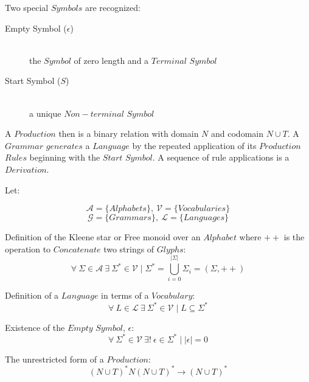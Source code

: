 \documentclass{article}
\begin{document}
Two special $Symbols$ are recognized:

    \begin{description}

    \item[Empty Symbol ($\epsilon$)] \hfill \\
    the $Symbol$ of zero length and a $Terminal$ $Symbol$

    \item[Start Symbol ($S$)] \hfill \\
    a unique $Non-terminal$ $Symbol$

    \end{description}

A $Production$ then is a binary relation with domain $N$ and codomain
$N \cup T$. A $Grammar$ $generates$ a $Language$ by the repeated application
of its $Production$ $Rules$ beginning with the $Start$ $Symbol$. A
sequence of rule applications is a $Derivation$.

Let:

\[
    \mathcal{A} = \{ Alphabets \},\: \mathcal{V} = \{ Vocabularies \}
\] \[
    \mathcal{G} = \{ Grammars \},\: \mathcal{L} = \{ Languages \}
\]

    \begin{description}

    \item Definition of the Kleene star or Free monoid over an
      $Alphabet$ where $++$ is the operation to $Concatenate$ two
      strings of $Glyphs$:
    \[
        \forall \: \Sigma \in \mathcal{A} \:
        \exists \: \Sigma^* \in \mathcal{V}
        \mid \Sigma^* = \bigcup_{i=0}^{|\Sigma|} \Sigma_i
        = (\Sigma,++)
    \]

    \item Definition of a $Language$ in terms of a $Vocabulary$:
    \[
        \forall \: L \in \mathcal{L} \:
        \exists \: \Sigma^* \in \mathcal{V}
        \mid L \subseteq \Sigma^*
    \]

    \item Existence of the $Empty$ $Symbol$, $\epsilon$:
    \[
        \forall \: \Sigma^* \in \mathcal{V} \:
        \exists ! \: \epsilon \in \Sigma^*
        \mid |\epsilon|=0
    \]

    \item The unrestricted form of a $Production$:
    \[
        (N \cup T)^*N(N \cup T)^* \rightarrow (N \cup T)^*
    \]

    \end{description}
\end{document}

